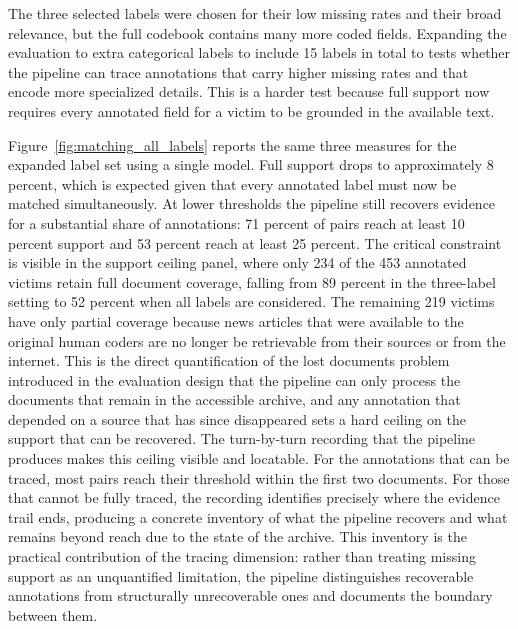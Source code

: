 \documentclass{article}
\begin{document}
The three selected labels were chosen for their low missing rates and their broad relevance, but the full codebook contains many more coded fields. Expanding the evaluation to extra categorical labels to include 15 labels in total to tests whether the pipeline can trace annotations that carry higher missing rates and that encode more specialized details. This is a harder test because full support now requires every annotated field for a victim to be grounded in the available text.

Figure~\ref{fig:matching_all_labels} reports the same three measures for the expanded label set using a single model. Full support drops to approximately 8 percent, which is expected given that every annotated label must now be matched simultaneously. At lower thresholds the pipeline still recovers evidence for a substantial share of annotations: 71 percent of pairs reach at least 10 percent support and 53 percent reach at least 25 percent. The critical constraint is visible in the support ceiling panel, where only 234 of the 453 annotated victims retain full document coverage, falling from 89 percent in the three-label setting to 52 percent when all labels are considered. The remaining 219 victims have only partial coverage because news articles that were available to the original human coders are no longer be retrievable from their sources or from the internet. This is the direct quantification of the lost documents problem introduced in the evaluation design that the pipeline can only process the documents that remain in the accessible archive, and any annotation that depended on a source that has since disappeared sets a hard ceiling on the support that can be recovered. The turn-by-turn recording that the pipeline produces makes this ceiling visible and locatable. For the annotations that can be traced, most pairs reach their threshold within the first two documents. For those that cannot be fully traced, the recording identifies precisely where the evidence trail ends, producing a concrete inventory of what the pipeline recovers and what remains beyond reach due to the state of the archive. This inventory is the practical contribution of the tracing dimension: rather than treating missing support as an unquantified limitation, the pipeline distinguishes recoverable annotations from structurally unrecoverable ones and documents the boundary between them.
\end{document}
